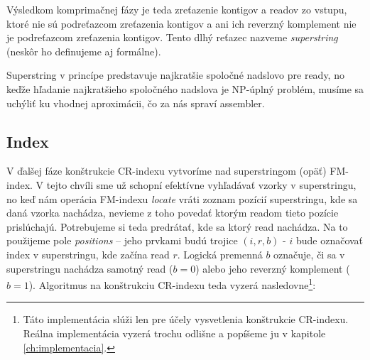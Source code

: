 Výsledkom komprimačnej fázy je teda zreťazenie kontigov a readov zo vstupu, ktoré nie sú podreťazcom zreťazenia kontigov a ani ich reverzný komplement nie je podreťazcom zreťazenia kontigov. Tento dlhý reťazec nazveme \emph{superstring} (neskôr ho definujeme aj formálne).

Superstring v princípe predstavuje najkratšie spoločné nadslovo pre ready, no keďže hľadanie najkratšieho spoločného nadslova je NP-úplný problém, musíme sa uchýliť ku vhodnej aproximácii, čo za nás spraví assembler.

\subsection{Index}
\label{ssec:index}
V ďalšej fáze konštrukcie CR-indexu vytvoríme nad superstringom (opäť) FM-index. V tejto chvíli sme už schopní efektívne vyhľadávať vzorky v superstringu, no keď nám operácia FM-indexu \emph{locate} vráti zoznam pozícií superstringu, kde sa daná vzorka nachádza, nevieme z toho povedať ktorým readom tieto pozície prislúchajú. Potrebujeme si teda predrátať, kde sa ktorý read nachádza. Na to použijeme pole \emph{positions} -- jeho prvkami budú trojice $(i, r, b)$ - $i$ bude označovať index v superstringu, kde začína read $r$. Logická premenná $b$ označuje, či sa v superstringu nachádza samotný read ($b=0$) alebo jeho reverzný komplement ($b=1$). Algoritmus na konštrukciu CR-indexu teda vyzerá nasledovne\footnote{Táto implementácia slúži len pre účely vysvetlenia konštrukcie CR-indexu. Reálna implementácia vyzerá trochu odlišne a popíšeme ju v kapitole \ref{ch:implementacia}.}:

